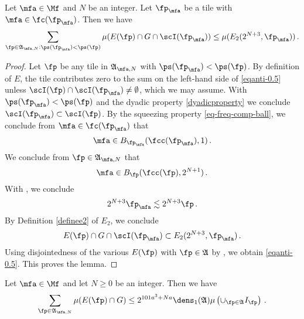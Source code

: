 \begin{lemma}\label{local-antichain-density}
\leanok
{}
Let $\mfa\in\Mf$ and {$N$} be
an integer. Let $\fp_{\mfa}$ be a tile with $\mfa\in \fc(\fp_{\mfa})$.
Then we have
\begin{equation}\label{eqanti-0.5}
    \sum_{\fp\in\mathfrak{A}_{\mfa,N}: \ps(\fp_{\mfa})<\ps(\fp)}\mu(E(\fp)\cap G \cap \scI(\fp_{\mfa}))
    \le \mu (E_2(2^{N+3},\fp_{\mfa}))
 \, .
\end{equation}



\end{lemma}

\begin{proof}
\leanok

Let $\fp$ be any tile in $\mathfrak{A}_{\mfa,N}$ with $\ps(\fp_{\mfa})<\ps(\fp)$. By definition of
$E$, the tile contributes zero to the sum on the left-hand side of \eqref{eqanti-0.5} unless
 $\scI(\fp)\cap \scI(\fp_{\mfa}) \neq \emptyset$, which we may assume. With $\ps(\fp_{\mfa})<\ps(\fp)$
and the dyadic property
\eqref{dyadicproperty} we conclude $\scI(\fp_{\mfa})\subset \scI(\fp)$.
By the squeezing property
\eqref{eq-freq-comp-ball},
we conclude from
$\mfa\in \fc(\fp_{\mfa})$
that
\begin{equation}
    \mfa\in B_{\fp_{\mfa}}(\fcc(\fp_{\mfa}), 1)\, .
\end{equation}
We conclude from $\fp \in \mathfrak{A}_{\mfa,N}$ that
\begin{equation}
    \mfa \in B_\fp(\fcc(\fp), 2^{N+1})\, .
\end{equation}
With , we conclude
\begin{equation}
    2^{N+3}\fp_{\mfa} \lesssim 2^{N+3}\fp \, .
\end{equation}
By Definition \eqref{definee2} of $E_2$, we conclude
\begin{equation}
    E(\fp)\cap G \cap \scI(\fp_{\mfa}) \subset E_2(2^{N+3},\fp_{\mfa})\, .
\end{equation}
Using disjointedness of the various $E(\fp)$ with $\fp\in \mathfrak{A}$ by , we obtain \eqref{eqanti-0.5}.
This proves the lemma.
\end{proof}
\begin{lemma}
\label{global-antichain-density}
\leanok
{}
Let $\mfa\in\Mf$ and let $N\ge 0$ be
an integer. Then we have
\begin{equation}\label{eqanti00}
    \sum_{\fp\in\mathfrak{A}_{\mfa,N}}\mu(E(\fp)\cap G)
    \le
 2^{101a^3+Na}\dens_1(\mathfrak{A})\mu\left(\cup_{\fp\in\mathfrak{A}}I_{\fp}\right)\, .
\end{equation}
\end{lemma}



